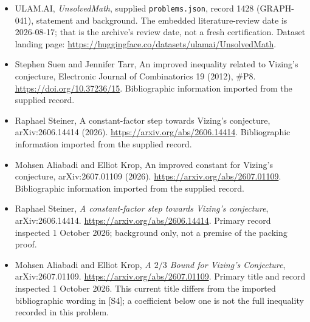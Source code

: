 \documentclass[11pt,a4paper]{article}
\begin{document}
{\small

\begin{itemize}

\item[\hypertarget{source:1428:1}{S1}] ULAM.AI, \emph{UnsolvedMath}, supplied \texttt{problems.json}, record 1428 (GRAPH-041), statement and background. The embedded literature-review date is 2026-08-17; that is the archive’s review date, not a fresh certification. Dataset landing page: \url{https://huggingface.co/datasets/ulamai/UnsolvedMath}.

\item[\hypertarget{source:1428:2}{S2}] Stephen Suen and Jennifer Tarr, An improved inequality related to Vizing's conjecture, Electronic Journal of Combinatorics 19 (2012), \#P8. \url{https://doi.org/10.37236/15}. Bibliographic information imported from the supplied record.

\item[\hypertarget{source:1428:3}{S3}] Raphael Steiner, A constant-factor step towards Vizing's conjecture, arXiv:2606.14414 (2026). \url{https://arxiv.org/abs/2606.14414}. Bibliographic information imported from the supplied record.

\item[\hypertarget{source:1428:4}{S4}] Mohsen Aliabadi and Elliot Krop, An improved constant for Vizing's conjecture, arXiv:2607.01109 (2026). \url{https://arxiv.org/abs/2607.01109}. Bibliographic information imported from the supplied record.


\item[E1] Raphael Steiner, \emph{A constant-factor
step towards Vizing's conjecture}, arXiv:2606.14414.
\url{https://arxiv.org/abs/2606.14414}. Primary record inspected
1 October 2026; background only, not a premise of the packing proof.
\item[E2] Mohsen Aliabadi and Elliot Krop, \emph{A $2/3$ Bound for
Vizing's Conjecture}, arXiv:2607.01109.
\url{https://arxiv.org/abs/2607.01109}. Primary title and record
inspected 1 October 2026. This current title differs from the imported
bibliographic wording in [S4]; a coefficient below one is not the
full inequality recorded in this problem.

\end{itemize}

}

\label{end:1428}
\end{document}
